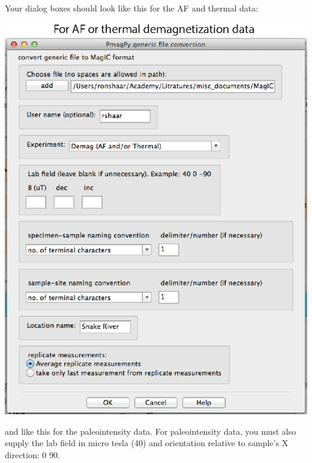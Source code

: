 \documentclass[11pt]{book}
\begin{document}
{\begin{itemize}
Your dialog boxes should look like this for the AF and thermal data:

\includegraphics[width=15cm]{EPSfiles/FigConvertGenericA.eps}

and like this for the  paleointensity data.  For paleointensity data, you must also supply the lab field in micro tesla (40) and orientation relative to sample's X direction:  0 90.


\end{itemize}}
\end{document}
